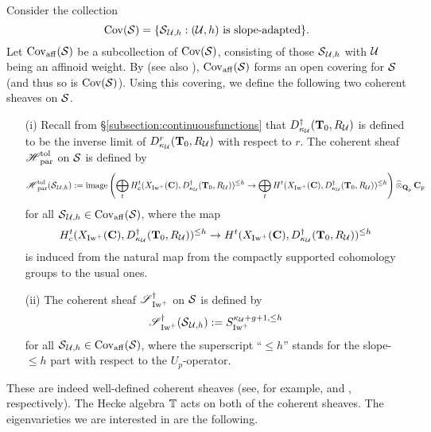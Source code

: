 Consider the collection $$\Cov(\calS)=\{\calS_{\calU, h}: (\calU, h)\text{ is slope-adapted}\}.$$ Let $\Cov_{\mathrm{aff}}(\calS)$ be a subcollection of $\Cov(\calS)$, consisting of those $\calS_{\calU, h}$ with $\calU$ being an affinoid weight. By \cite[Theorem 4.6]{Buzzard_2007} (see also \cite[Proposition 4.1.4]{Hansen-PhD}), $\Cov_{\mathrm{aff}}(\calS)$ forms an open covering for $\calS$ (and thus so is $\Cov(\calS)$). Using this covering, we define the following two coherent sheaves on $\calS$.

\begin{Definition}
\begin{enumerate}
\item[(i)] Recall from \S \ref{subsection:continuousfunctions} that $D_{\kappa_{\calU}}^{\dagger}(\T_0, R_{\calU})$ is defined to be the inverse limit of $D_{\kappa_{\calU}}^r(\T_0, R_{\calU})$ with respect to $r$. The coherent sheaf $\scrH_{\Par}^{\tol}$ on $\calS$ is defined by
$$\scrH_{\Par}^{\tol}(\calS_{\calU, h}):=\image\left(\bigoplus_{t}H_{c}^t(X_{\Iw^+}(\C), D_{\kappa_{\calU}}^{\dagger}(\T_0, R_{\calU}))^{\leq h}\rightarrow \bigoplus_{t}H^t(X_{\Iw^+}(\C), D_{\kappa_{\calU}}^{\dagger}(\T_0, R_{\calU}))^{\leq h}\right)\widehat{\otimes}_{\Q_p} \C_p$$
for all $\calS_{\calU, h}\in\Cov_{\mathrm{aff}}(\calS)$, where the map $$H_{c}^t(X_{\Iw^+}(\C), D_{\kappa_{\calU}}^{\dagger}(\T_0, R_{\calU}))^{\leq h}\rightarrow H^t(X_{\Iw^+}(\C), D_{\kappa_{\calU}}^{\dagger}(\T_0, R_{\calU}))^{\leq h}$$ is induced from the natural map from the compactly supported cohomology groups to the usual ones.

\item[(ii)] The coherent sheaf $\scrS_{\Iw^+}^{\dagger}$ on $\calS$ is defined by
$$\scrS_{\Iw^+}^{\dagger}(\calS_{\calU, h}):=S_{\Iw^+}^{ \kappa_{\calU}+g+1, \leq h}$$
for all $\calS_{\calU, h}\in\Cov_{\mathrm{aff}}(\calS)$, where the superscript ``$\leq h$'' stands for the slope-$\leq h$ part with respect to the $U_p$-operator.
\end{enumerate}
\end{Definition}

These are indeed well-defined coherent sheaves (see, for example, \cite[\S 4.3]{Hansen-PhD} and \cite[\S 8.1]{AIP-2015}, respectively). The Hecke algebra $\bbT$ acts on both of the coherent sheaves. The eigenvarieties we are interested in are the following.


